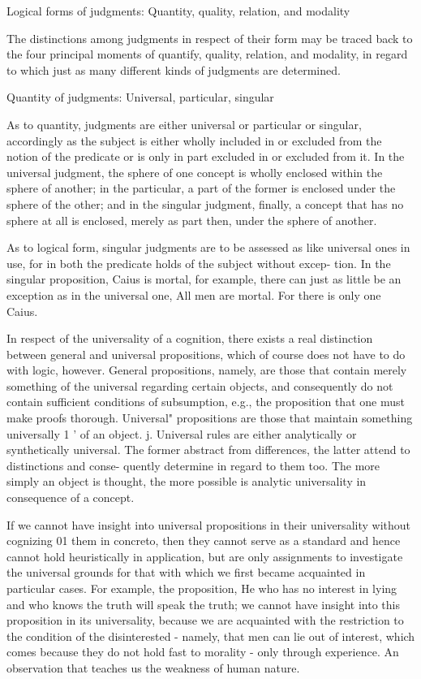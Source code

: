 Logical forms of judgments: Quantity, quality, relation, and modality

The distinctions among judgments in respect of their form may be traced back to
the four principal moments of quantify, quality, relation, and modality,
in regard to which just as many different kinds of judgments are determined.

Quantity of judgments: Universal, particular, singular

As to quantity, judgments are either universal or particular or singular,
accordingly as the subject is either wholly included in or excluded from the
notion of the predicate or is only in part excluded in or excluded from it.
In the universal judgment, the sphere of one concept is
wholly enclosed within the sphere of another;
in the particular, a part of the former is enclosed under the sphere of the other;
and in the singular judgment, finally, a concept that has no sphere at all is
enclosed, merely as part then, under the sphere of another.

    As to logical form, singular judgments are to be assessed as like universal
    ones in use, for in both the predicate holds of the subject without excep-
    tion. In the singular proposition, Caius is mortal, for example, there can
    just as little be an exception as in the universal one, All men are mortal.
    For there is only one Caius.

    In respect of the universality of a cognition, there exists a real distinction
    between general and universal propositions, which of course does not
    have to do with logic, however. General propositions, namely, are those
    that contain merely something of the universal regarding certain objects,
    and consequently do not contain sufficient conditions of subsumption,
    e.g., the proposition that one must make proofs thorough. Universal"
    propositions are those that maintain something universally 1 ' of an object.
    j. Universal rules are either analytically or synthetically universal. The former
    abstract from differences, the latter attend to distinctions and conse-
    quently determine in regard to them too. The more simply an object is
    thought, the more possible is analytic universality in consequence of a
    concept.

    If we cannot have insight into universal propositions in their universality
    without cognizing 01 them in concreto, then they cannot serve as a standard
    and hence cannot hold heuristically in application, but are only assignments
    to investigate the universal grounds for that with which we first became
    acquainted in particular cases. For example, the proposition, He who has no
    interest in lying and who knows the truth will speak the truth; we cannot have
    insight into this proposition in its universality, because we are acquainted
    with the restriction to the condition of the disinterested - namely, that
    men can lie out of interest, which comes because they do not hold fast to
    morality - only through experience. An observation that teaches us the
    weakness of human nature.

